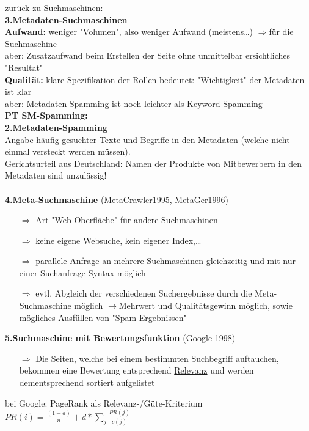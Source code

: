 \vspace*{1cm}
zurück zu Suchmaschinen:\\
\textbf{3.Metadaten-Suchmaschinen}\\
\textbf{Aufwand:} weniger "Volumen", also weniger Aufwand (meistens\dots) $\Rightarrow$für die Suchmaschine\\
aber: Zusatzaufwand beim Erstellen der Seite ohne unmittelbar ersichtliches "Resultat"\\
\textbf{Qualität:} klare Spezifikation der Rollen bedeutet: "Wichtigkeit" der Metadaten ist klar\\
aber: Metadaten-Spamming ist noch leichter als Keyword-Spamming\\
\textbf{PT SM-Spamming:}\\
\textbf{2.Metadaten-Spamming}\\
Angabe häufig gesuchter Texte und Begriffe in den Metadaten (welche nicht einmal versteckt werden müssen).\\
Gerichtsurteil aus Deutschland: Namen der Produkte von Mitbewerbern in den Metadaten sind unzulässig!\\
\\
\textbf{4.Meta-Suchmaschine} (MetaCrawler1995, MetaGer1996)
\begin{itemize}
\item[$\Rightarrow$]Art "Web-Oberfläche" für andere Suchmaschinen
\item[$\Rightarrow$]keine eigene Websuche, kein eigener Index,\dots
\item[$\Rightarrow$]parallele Anfrage an mehrere Suchmaschinen gleichzeitig und mit nur einer Suchanfrage-Syntax möglich
\item[$\Rightarrow$]evtl. Abgleich der verschiedenen Suchergebnisse durch die Meta-Suchmaschine möglich $\rightarrow$Mehrwert und Qualitätsgewinn möglich, sowie mögliches Ausfüllen von "Spam-Ergebnissen"
\end{itemize}
\vspace*{5mm}
\textbf{5.Suchmaschine mit Bewertungsfunktion} (Google 1998)
\begin{itemize}
\item[$\Rightarrow$]Die Seiten, welche bei einem bestimmten Suchbegriff auftauchen, bekommen eine Bewertung entsprechend \underline{Relevanz} und werden dementsprechend sortiert aufgelistet
\end{itemize}
bei Google: PageRank als Relevanz-/Güte-Kriterium\\
\(PR(i)=\frac{(1-d)}{n} + d*\sum \limits_{j}\frac{PR(j)}{c(j)}\)\\
